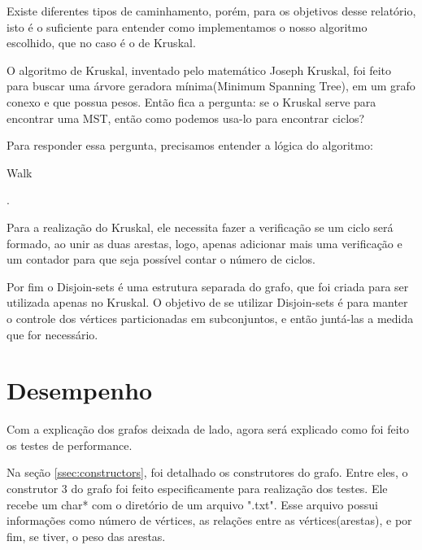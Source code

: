 \documentclass[12pt]{article}
\begin{document}
  Existe diferentes tipos de caminhamento, porém, para os objetivos desse relatório, isto 
  é o suficiente para entender como implementamos o nosso algoritmo escolhido, que no caso 
  é o de Kruskal.

  O algoritmo de Kruskal, inventado pelo matemático Joseph Kruskal, foi feito para buscar 
  uma árvore geradora mínima(Minimum Spanning Tree), em um grafo conexo e que possua pesos. 
  Então fica a pergunta: se o Kruskal serve para encontrar uma MST, então como podemos usa-lo 
  para encontrar ciclos? 

  Para responder essa pergunta, precisamos entender a lógica do algoritmo:

  \begin{algorithm}
    \caption{Walk} \label{euclid2}
    \begin{algorithmic}[1]
    \EndFor
    .
    \EndIf
    \EndWhile
    \EndProcedure
    \end{algorithmic}
  \end{algorithm}

  Para a realização do Kruskal, ele necessita fazer a verificação se um ciclo será formado,
  ao unir as duas arestas, logo, apenas adicionar mais uma verificação e um contador para 
  que seja possível contar o número de ciclos.

  Por fim o Disjoin-sets é uma estrutura separada do grafo, que foi criada para ser utilizada
  apenas no Kruskal. O objetivo de se utilizar Disjoin-sets é para manter o controle dos vértices 
  particionadas em subconjuntos, e então juntá-las a medida que for necessário.

  \section{Desempenho} \label{sec:performance}

  Com a explicação dos grafos deixada de lado, agora será explicado como foi feito os testes de performance.

  Na seção \ref{ssec:constructors}, foi detalhado os construtores do grafo. Entre eles,
  o construtor 3 do grafo foi feito especificamente para realização dos testes. Ele 
  recebe um char* com o diretório de um arquivo ".txt". Esse arquivo possui informações como número de 
  vértices, as relações entre as vértices(arestas), e por fim, se tiver, o peso das arestas.
\end{document}
